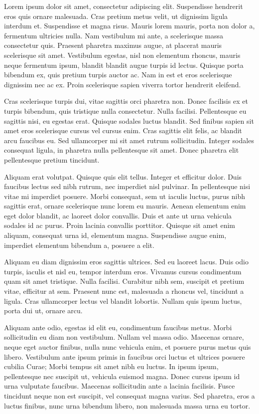 Lorem ipsum dolor sit amet, consectetur adipiscing elit. Suspendisse hendrerit eros quis ornare malesuada. Cras pretium metus velit, ut dignissim ligula interdum et. Suspendisse et magna risus. Mauris lorem mauris, porta non dolor a, fermentum ultricies nulla. Nam vestibulum mi ante, a scelerisque massa consectetur quis. Praesent pharetra maximus augue, at placerat mauris scelerisque sit amet. Vestibulum egestas, nisl non elementum rhoncus, mauris neque fermentum ipsum, blandit blandit augue turpis id lectus. Quisque porta bibendum ex, quis pretium turpis auctor ac. Nam in est et eros scelerisque dignissim nec ac ex. Proin scelerisque sapien viverra tortor hendrerit eleifend.

Cras scelerisque turpis dui, vitae sagittis orci pharetra non. Donec facilisis ex et turpis bibendum, quis tristique nulla consectetur. Nulla facilisi. Pellentesque eu sagittis nisi, eu egestas erat. Quisque sodales luctus blandit. Sed finibus sapien sit amet eros scelerisque cursus vel cursus enim. Cras sagittis elit felis, ac blandit arcu faucibus eu. Sed ullamcorper mi sit amet rutrum sollicitudin. Integer sodales consequat ligula, in pharetra nulla pellentesque sit amet. Donec pharetra elit pellentesque pretium tincidunt.

Aliquam erat volutpat. Quisque quis elit tellus. Integer et efficitur dolor. Duis faucibus lectus sed nibh rutrum, nec imperdiet nisl pulvinar. In pellentesque nisi vitae mi imperdiet posuere. Morbi consequat, sem ut iaculis luctus, purus nibh sagittis erat, ornare scelerisque nunc lorem eu mauris. Aenean elementum enim eget dolor blandit, ac laoreet dolor convallis. Duis et ante ut urna vehicula sodales id ac purus. Proin lacinia convallis porttitor. Quisque sit amet enim aliquam, consequat urna id, elementum magna. Suspendisse augue enim, imperdiet elementum bibendum a, posuere a elit.

Aliquam eu diam dignissim eros sagittis ultrices. Sed eu laoreet lacus. Duis odio turpis, iaculis et nisl eu, tempor interdum eros. Vivamus cursus condimentum quam sit amet tristique. Nulla facilisi. Curabitur nibh sem, suscipit et pretium vitae, efficitur at sem. Praesent nunc est, malesuada a rhoncus vel, tincidunt a ligula. Cras ullamcorper lectus vel blandit lobortis. Nullam quis ipsum luctus, porta dui ut, ornare arcu.

Aliquam ante odio, egestas id elit eu, condimentum faucibus metus. Morbi sollicitudin eu diam non vestibulum. Nullam vel massa odio. Maecenas ornare, neque eget auctor finibus, nulla nunc vehicula enim, et posuere purus metus quis libero. Vestibulum ante ipsum primis in faucibus orci luctus et ultrices posuere cubilia Curae; Morbi tempus sit amet nibh eu luctus. In ipsum ipsum, pellentesque nec suscipit ut, vehicula euismod magna. Donec cursus ipsum id urna vulputate faucibus. Maecenas sollicitudin ante a lacinia facilisis. Fusce tincidunt neque non est suscipit, vel consequat magna varius. Sed pharetra, eros a luctus finibus, nunc urna bibendum libero, non malesuada massa urna eu tortor.